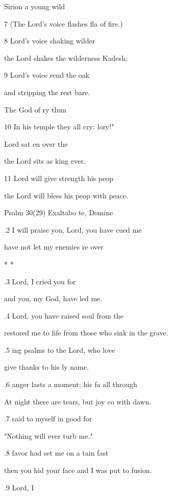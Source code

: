  Sirion  a young wild  

7 (The Lord's voice flashes fla of fire.) 

8  Lord's voice shaking  wilder 

the Lord shakes the wilderness  Kadesh; 

9  Lord's voice rend the oak  

and stripping the rest bare. 

 The God of ry thun 

10 In his temple they all cry: lory!" 

 Lord sat en over the  

the Lord sits as king  ever. 

11  Lord will give strength  his peop 

the Lord will bless his peop with peace. 

Psalm 30(29) Exaltabo te, Domine 


.2 I will praise you, Lord, you have cued me 

 have not let my enemies re over  

\pl{*} * * 

.3  Lord, I cried  you for  

and you, my God, have led me. 

.4  Lord, you have raised  soul from the  

restored me to life from those who sink in the grave. 

.5 ing psalms to the Lord,  who love  

give thanks to his ly name. 

.6  anger lasts a moment; his fa all through  

At night there are tears, but joy co with dawn. 

.7  said to myself in  good for 

"Nothing will ever turb me." 

.8  favor had set me on a tain fast 

then you hid your face and I was put to fusion. 

.9   Lord, I  

